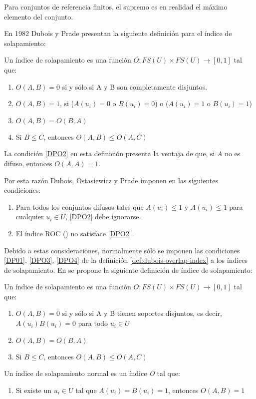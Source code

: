 Para conjuntos de referencia finitos, el supremo es en realidad el máximo elemento del conjunto.

En 1982 Dubois y Prade \cite{dubois2000} presentan la siguiente definición para el índice de solapamiento:

\begin{definition}
Un índice de solapamiento es una función $O : FS(U) \times FS(U) \rightarrow [0,1]$ tal que:
\begin{enumerate}[label=(O\arabic*),ref=(O\arabic*)]
\item $O(A,B) = 0$ si y sólo si A y B son completamente disjuntos. \label{DP01}
\item $O(A,B) = 1$, si ($A(u_{i}) = 0$ o $B(u_{i}) = 0$) o ($A(u_{i}) = 1$ o $B(u_{i}) = 1$) \label{DPO2}
\item $O(A,B) = O(B,A)$ \label{DPO3}
\item Si $B \leq C$, entonces $O(A,B) \leq O(A,C)$ \label{DPO4}
\end{enumerate}
\end{definition} \label{def:dubois-overlap-index}
La condición \ref{DPO2} en esta definición presenta la ventaja de que, si \emph{A} no es difuso, entonces $O(A,A) = 1$.

Por esta razón Dubois, Ostasiewicz y Prade imponen en \cite{dubois2000} las siguientes condiciones:
\begin{enumerate}[label=(\arabic*),ref=(\arabic*)]
\item Para todos los conjuntos difusos tales que $A(u_{i}) \le 1$ y $A(u_{i}) \le 1$ para cualquier $u_{i} \in U$, \ref{DPO2} debe ignorarse.
\item El índice ROC (\cite{dubois2000}) no satisface \ref{DPO2}.
\end{enumerate}
Debido a estas consideraciones, normalmente sólo se imponen las condiciones \ref{DP01}, \ref{DPO3}, \ref{DPO4} de la definición \ref{def:dubois-overlap-index} a los índices de solapamiento.
En \cite{bustince2013overlap} se propone la siguiente definición de índice de solapamiento:
\begin{definition}\label{def:bustince-overlap-index}
Un índice de solapamiento es una función $O : FS(U) \times FS(U) \rightarrow [0,1]$ tal que:
\begin{enumerate}[label=(O\arabic*),ref=(O\arabic*)]
\item $O(A,B) = 0$ si y sólo si A y B tienen soportes disjuntos, es decir, $A(u_{i})B(u_{i}) = 0$ para todo $u_{i} \in U$\label{BO1}
\item $O(A,B) = O(B,A)$\label{BO2}
\item Si $B \leq C$, entonces $O(A,B) \leq O(A,C)$\label{BO3}
\end{enumerate}
Un índice de solapamiento normal es un índice \emph{O} tal que:
\begin{enumerate}[label=(O4),ref=(O4)]
\item Si existe un $u_{i} \in U$ tal que $A(u_{i}) = B(u_{i}) = 1$, entonces $O(A,B) = 1$\label{BO4}
\end{enumerate}
\end{definition}
